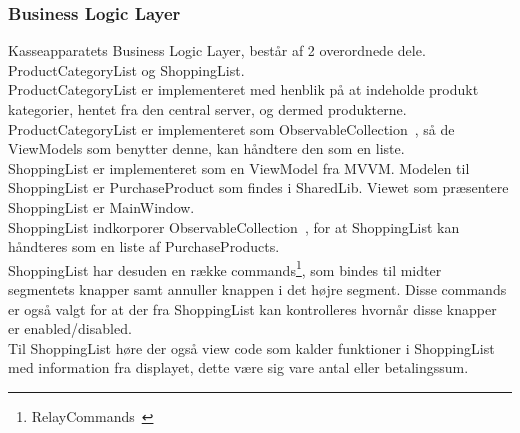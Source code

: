 \subsubsection{Business Logic Layer}
Kasseapparatets Business Logic Layer, består af 2 overordnede dele. ProductCategoryList og ShoppingList. \\

ProductCategoryList er implementeret med henblik på at indeholde produkt kategorier, hentet fra den central server, og dermed produkterne. ProductCategoryList er implementeret som ObservableCollection~\cite{ObsCol}, så de ViewModels som benytter denne, kan håndtere den som en liste.\\

ShoppingList er implementeret som en ViewModel fra MVVM. Modelen til ShoppingList er PurchaseProduct som findes i SharedLib. Viewet som præsentere ShoppingList er MainWindow. \\
ShoppingList indkorporer ObservableCollection~\cite{ObsCol}, for at ShoppingList kan håndteres som en liste af PurchaseProducts. \\
ShoppingList har desuden en række commands\footnote{RelayCommands~\cite{RelayC}}, som bindes til midter segmentets knapper samt annuller knappen i det højre segment. Disse commands er også valgt for at der fra ShoppingList kan kontrolleres hvornår disse knapper er enabled/disabled.\\
Til ShoppingList høre der også view code som kalder funktioner i ShoppingList med information fra displayet, dette være sig vare antal eller betalingssum.\\